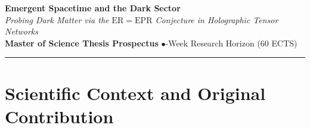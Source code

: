 \documentclass[10pt,a4paper]{article}
\begin{document}
\begin{center}
    {\LARGE\textbf{\color{navyblue}Emergent Spacetime and the Dark Sector}}\\[0.4em]
    {\large\textit{Probing Dark Matter via the $\mathrm{ER}=\mathrm{EPR}$ Conjecture in Holographic Tensor Networks}}\\[0.8em]
    \textbf{Master of Science Thesis Prospectus} \quad$\bullet$-Week Research Horizon (60 ECTS)
\end{center}

\vspace{-0.5em}
\noindent\rule{\textwidth}{0.8pt}
\vspace{0.3em}

\begin{abstract}
\noindent The missing dynamical mass inferred from galactic kinematics remains an outstanding challenge to the standard $\Lambda\mathrm{CDM}$ paradigm, where decades of particle dark matter searches have yielded null bounds. This thesis develops a discrete, computational realization of emergent gravity, testing whether the phenomenon of dark matter can be accounted for by non-local quantum entanglement defects without particle relics. Grounded in the $\mathrm{ER}=\mathrm{EPR}$ conjecture~\cite{maldacena2013}, Verlinde's entropic gravity~\cite{verlinde2016}, and fundamentally in the \emph{Fractal Entanglement Quantum Gravity} (FEQG) framework formulated by Gin\'e~\cite{gine2026}, continuous 2D spatial manifolds are discretized into hyperbolic tensor networks. Edge lengths follow Gin\'e's information-theoretic metric $d_{ij} = -l_0 \ln(I_{ij}/I_0)$~\cite{gine2026}, while non-local Planckian Einstein--Rosen bridges induce an informational stress tensor $E_{\mu\nu} \sim \nabla_\mu \nabla_\nu S_{\text{ent}}$ and modified potentials $V(r) \sim 1/r^{1+\epsilon}$~\cite{gine2026}. Utilizing graph-theoretic min-cut algorithms (discrete Ryu--Takayanagi~\cite{ryu2006}), we extract emergent radial potentials $\Phi(r)$ and circular velocity fields $v_c(r)$. The model is directly tested against 1D rotation curves from the SPARC database~\cite{sparc2016}, 2D kinematic fields from SDSS/MaNGA, and gravitational microlensing constraints from the Large Magellanic Cloud (LMC/MACHO)~\cite{macho2001}.
\end{abstract}

\vspace{-0.5em}
\section{Scientific Context and Original Contribution}
\label{sec:context}
\end{document}
